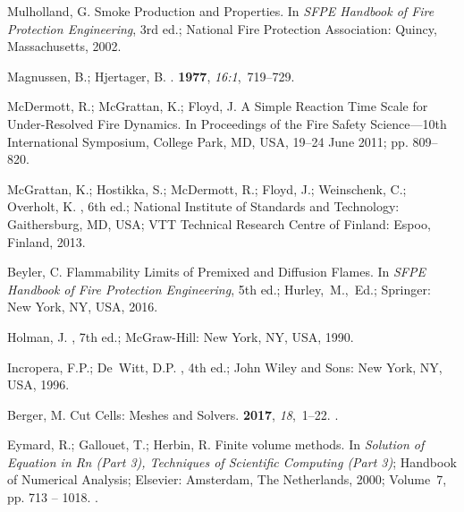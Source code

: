 \documentclass[atmosphere,article,accept,moreauthors,pdftex]{Definitions/mdpi}
\begin{document}
\begin{thebibliography}{999}
Mulholland, G.
\newblock Smoke Production and Properties. In {\em SFPE Handbook of Fire
  Protection Engineering}, 3rd ed.; National Fire Protection Association:
  Quincy, Massachusetts,  2002.

Magnussen, B.; Hjertager, B.
.
 {\bf 1977}, {\em
  16:1},~719--729.

McDermott, R.; McGrattan, K.; Floyd, J.
\newblock A Simple Reaction Time Scale for Under-Resolved Fire Dynamics.
\newblock  In Proceedings of the Fire Safety Science---10th International
  Symposium,  College Park, MD, USA,  19--24 June 2011; pp. 809--820.

McGrattan, K.; Hostikka, S.; McDermott, R.; Floyd, J.; Weinschenk, C.;
  Overholt, K.
, 6th ed.;
\newblock National Institute of Standards and Technology: Gaithersburg,
  MD, USA;  VTT Technical Research Centre of Finland: Espoo, Finland, 2013.

Beyler, C.
\newblock Flammability Limits of Premixed and Diffusion Flames. In {\em SFPE
  Handbook of Fire Protection Engineering}, 5th ed.;  \mbox{Hurley, M., Ed.;}
  Springer: New York, NY, USA, 2016.

Holman, J.
, 7th ed.; McGraw-Hill: New York, NY, USA, 1990.

Incropera, F.P.; De~Witt, D.P.
, 4th ed.; John Wiley and
  Sons: New York,  NY, USA, 1996.

Berger, M.
\newblock Cut Cells: Meshes and Solvers.
 {\bf 2017}, {\em 18},~1--22.
.

Eymard, R.; Gallouet, T.; Herbin, R.
\newblock Finite volume methods. In {\em Solution of Equation in Rn (Part 3),
  Techniques of Scientific Computing (Part 3)}; Handbook of Numerical Analysis;  Elsevier: Amsterdam, The Netherlands, 2000; Volume~7,  pp. 713 -- 1018.
.


\end{thebibliography}
\end{document}
